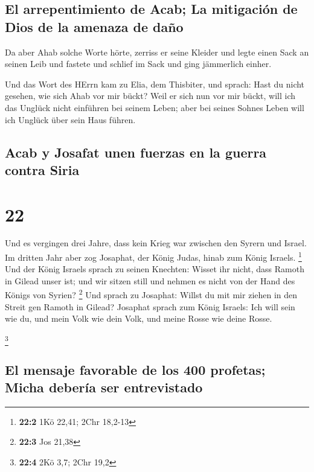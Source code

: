 \hypertarget{el-arrepentimiento-de-acab-la-mitigaciuxf3n-de-dios-de-la-amenaza-de-dauxf1o}{%
\subsection{El arrepentimiento de Acab; La mitigación de Dios de la
amenaza de
daño}\label{el-arrepentimiento-de-acab-la-mitigaciuxf3n-de-dios-de-la-amenaza-de-dauxf1o}}

 Da aber Ahab solche Worte hörte, zerriss er seine
Kleider und legte einen Sack an seinen Leib und fastete und schlief im
Sack und ging jämmerlich einher.

 Und das Wort des HErrn kam zu Elia, dem Thisbiter, und
sprach:  Hast du nicht gesehen, wie sich Ahab vor mir
bückt? Weil er sich nun vor mir bückt, will ich das Unglück nicht
einführen bei seinem Leben; aber bei seines Sohnes Leben will ich
Unglück über sein Haus führen.

\hypertarget{acab-y-josafat-unen-fuerzas-en-la-guerra-contra-siria}{%
\subsection{Acab y Josafat unen fuerzas en la guerra contra
Siria}\label{acab-y-josafat-unen-fuerzas-en-la-guerra-contra-siria}}

\hypertarget{section-21}{%
\section{22}\label{section-21}}

 Und es vergingen drei Jahre, dass kein Krieg war zwischen
den Syrern und Israel.  Im dritten Jahr aber zog Josaphat,
der König Judas, hinab zum König Israels. \footnote{\textbf{22:2} 1Kö
  22,41; 2Chr 18,2-13}  Und der König Israels sprach zu
seinen Knechten: Wisset ihr nicht, dass Ramoth in Gilead unser ist; und
wir sitzen still und nehmen es nicht von der Hand des Königs von Syrien?
\footnote{\textbf{22:3} Jos 21,38}  Und sprach zu
Josaphat: Willst du mit mir ziehen in den Streit gen Ramoth in Gilead?
Josaphat sprach zum König Israels: Ich will sein wie du, und mein Volk
wie dein Volk, und meine Rosse wie deine Rosse.

\footnote{\textbf{22:4} 2Kö 3,7; 2Chr 19,2}

\hypertarget{el-mensaje-favorable-de-los-400-profetas-micha-deberuxeda-ser-entrevistado}{%
\subsection{El mensaje favorable de los 400 profetas; Micha debería ser
entrevistado}\label{el-mensaje-favorable-de-los-400-profetas-micha-deberuxeda-ser-entrevistado}}

